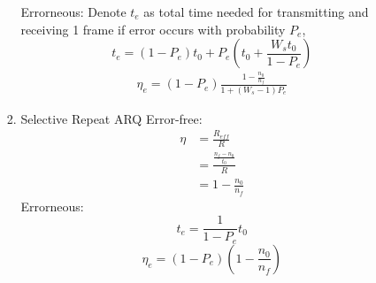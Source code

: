 \documentclass{article}
\begin{document}
\begin{enumerate}
\begin{enumerate}[1)]
\begin{enumerate}
        \newline Errorneous:
        \newline Denote $t_e$ as total time needed for transmitting and receiving 1 frame if error occurs with probability $P_e$,
        \begin{equation*}
                t_e = (1-P_e)t_0+P_e(t_0+\frac{W_st_0}{1-P_e})
        \end{equation*}
        \begin{equation*}
            \begin{split}
                \eta_e = (1-P_e)\frac{1-\frac{n_0}{n_f}}{1+(W_s-1)P_e}
            \end{split}
        \end{equation*}
        
        
        \item
        Selective Repeat ARQ
        \newline Error-free:
        \begin{equation*}
            \begin{split}
                \eta &= \frac{R_{eff}}{R}\\
                &=\frac{\frac{n_f-n_0}{t_0}}{R}\\
                &=1-\frac{n_0}{n_f}
            \end{split}
        \end{equation*}
        \newline Errorneous:
        $$t_e=\frac{1}{1-P_e}t_0$$
        $$\eta_e= (1-P_e)(1-\frac{n_0}{n_f})$$
        
    \end{enumerate}
    
    \end{enumerate}
    
\end{enumerate}
\end{document}

